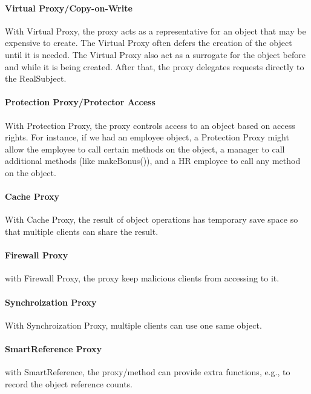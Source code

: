 \documentclass{book}
\begin{document}
\paragraph{Virtual Proxy/Copy-on-Write}
With Virtual Proxy, the proxy acts as a representative for an object that may be expensive to create. The Virtual Proxy often defers the creation of the object until it is needed.
The Virtual Proxy also act as a surrogate for the object before and while it is being created. After that, the proxy delegates requests directly to the RealSubject.
\paragraph{Protection Proxy/Protector Access}
With Protection Proxy, the proxy controls access to an object based on access rights.
For instance, if we had an employee object, a Protection Proxy might allow the employee to call certain methods on the object,
a manager to call additional methods (like makeBonus()), and a HR employee to call any method on the object.
\paragraph{Cache Proxy}
With Cache Proxy, the result of object operations has temporary save space so that multiple clients can share the result.
\paragraph{Firewall Proxy}
with Firewall Proxy, the proxy keep malicious clients from accessing to it.
\paragraph{Synchroization Proxy}
With Synchroization Proxy, multiple clients can use one same object.
\paragraph{SmartReference Proxy}
with SmartReference, the proxy/method can provide extra functions, e.g., to record the object reference counts.
\end{document}
